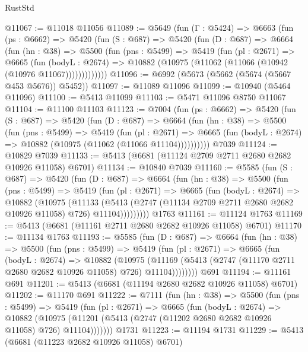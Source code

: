 \begin{lexlean}{RustStd}
\begin{coremodule}
@11067 := @11018 @11056
@11089 := @5649
    (fun (Γ : @5424) =>
    @6663
      (fun (ps : @6662) =>
      @5420
        (fun (S : @687) =>
        @5420
          (fun (D : @687) =>
          @6664
            (fun (hn : @38) =>
            @5500
              (fun (pns : @5499) =>
              @5419
                (fun (pl : @2671) =>
                @6665
                  (fun (bodyL : @2674) =>
                  @10882 (@10975 (@11062 (@11066 (@10942 (@10976 @11067)))))))))))))
@11096 := @6992 (@5673 (@5662 (@5674 (@5667 @453 @5676)) @5452))
@11097 := @11089 @11096
@11099 := @10940 (@5464 @11096)
@11100 := @5413 @11099
@11103 := @5471 @11096 @8750 @11067
@11104 := @11100 @11103
@11123 := @7004
    (fun (ps : @6662) =>
    @5420
      (fun (S : @687) =>
      @5420
        (fun (D : @687) =>
        @6664
          (fun (hn : @38) =>
          @5500
            (fun (pns : @5499) =>
            @5419
              (fun (pl : @2671) =>
              @6665 (fun (bodyL : @2674) => @10882 (@10975 (@11062 (@11066 @11104))))))))))
    @7039
@11124 := @10829 @7039
@11133 := @5413 (@6681 (@11124 @2709 @2711 @2680 @2682 @10926 @11058) @6701)
@11134 := @10840 @7039
@11160 := @5585
    (fun (S : @687) =>
    @5420
      (fun (D : @687) =>
      @6664
        (fun (hn : @38) =>
        @5500
          (fun (pns : @5499) =>
          @5419
            (fun (pl : @2671) =>
            @6665
              (fun (bodyL : @2674) =>
              @10882
                (@10975
                  (@11133
                    (@5413
                      (@2747 (@11134 @2709 @2711 @2680 @2682 @10926 @11058) @726)
                      @11104)))))))))
    @1763
@11161 := @11124 @1763
@11169 := @5413 (@6681 (@11161 @2711 @2680 @2682 @10926 @11058) @6701)
@11170 := @11134 @1763
@11193 := @5585
    (fun (D : @687) =>
    @6664
      (fun (hn : @38) =>
      @5500
        (fun (pns : @5499) =>
        @5419
          (fun (pl : @2671) =>
          @6665
            (fun (bodyL : @2674) =>
            @10882
              (@10975
                (@11169 (@5413 (@2747 (@11170 @2711 @2680 @2682 @10926 @11058) @726) @11104))))))))
    @691
@11194 := @11161 @691
@11201 := @5413 (@6681 (@11194 @2680 @2682 @10926 @11058) @6701)
@11202 := @11170 @691
@11222 := @7111
    (fun (hn : @38) =>
    @5500
      (fun (pns : @5499) =>
      @5419
        (fun (pl : @2671) =>
        @6665
          (fun (bodyL : @2674) =>
          @10882
            (@10975 (@11201 (@5413 (@2747 (@11202 @2680 @2682 @10926 @11058) @726) @11104)))))))
    @1731
@11223 := @11194 @1731
@11229 := @5413 (@6681 (@11223 @2682 @10926 @11058) @6701)

\end{coremodule}
\end{lexlean}
